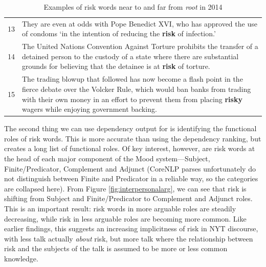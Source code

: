 \begin{table}
\begin{tabularx}{\linewidth}{p{}p{}}
13   & They are even at odds with Pope Benedict XVI, who has approved the use of condoms `in the intention of reducing the \textbf{risk} of infection.'   \\ 
14   &  The United Nations Convention Against Torture prohibits the transfer of a detained person to the custody of a state where there are substantial grounds for believing that the detainee is at \textbf{risk} of torture. \\ 
15    &  The trading blowup that followed has now become a flash point in the fierce debate over the Volcker Rule, which would ban banks from trading with their own money in an effort to prevent them from placing \textbf{risky} wagers while enjoying government backing.  \\ 
\bottomrule

\end{tabularx}
\caption{Examples of risk words near to and far from \emph{root} in 2014}
\label{conc:distanceroot}
\end{table}


The second thing we can use dependency output for is identifying the functional roles of risk words. This is more accurate than using the dependency ranking, but creates a long list of functional roles. Of key interest, however, are risk words at the head of each major component of the Mood system---Subject, Finite\slash Predicator, Complement and Adjunct (CoreNLP parses unfortunately do not distinguish between Finite and Predicator in a reliable way, so the categories are collapsed here). From Figure \ref{fig:interpersonalarg}, we can see that risk is shifting from Subject and Finite\slash Predicator to Complement and Adjunct roles. This is an important result: risk words in more arguable roles are steadily decreasing, while risk in less arguable roles are becoming more common. Like earlier findings, this suggests an increasing implicitness of risk in NYT discourse, with less talk actually \emph{about} risk, but more talk where the relationship between risk and the subjects of the talk is assumed to be more or less common knowledge.

